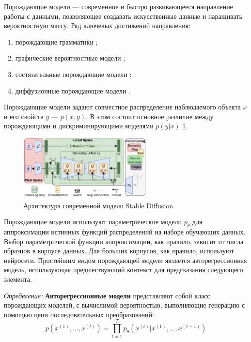 Порождающие модели --- современное и быстро развивающееся направление работы с данными, позволяющее создавать искусственные данные и 
наращивать вероятностную массу. Ряд ключевых достижений направления:
\begin{enumerate}
    \item порождающие грамматики \cite{chomsky2002syntactic};
    \item графические вероятностные модели \cite{pearl1988probabilistic};
    \item состязательные порождающие модели \cite{goodfellow2020generative};
    \item диффузионные порождающие модели \cite{song2020score}.
\end{enumerate}
Порождающие модели задают совместное распределение наблюдаемого объекта $x$ и его свойств $y$ --- $p(x,y)$. 
В этом состоит основное различие между порождающими и дискриминирующими моделями $p(y|x)$ \ref{discr_vs_gen}.
\begin{figure}[h]
    \centering
    \includegraphics[width=0.6\textwidth]{assets/ml/generation/stable_diffusion.png}
    \caption{Архитектура современной модели Stable Diffusion.}
    \label{discr_vs_gen}
\end{figure}

Порождающие модели используют параметрические модели $p_\theta$ для аппроксимации истинных функций распределений на наборе обучающих данных.
Выбор параметрической функции аппроксимации, как правило, зависит от числа образцов в корпусе данных. Для больших корпусов, как правило, используют нейросети.
Простейшим видом порождающей модели является авторегрессионная модель, использующая предшествующий контекст для предсказания следующего элемента.

\textit{Определение:} \textbf{Авторегрессионные модели} представляют собой класс порождающих моделей,
с вычислимой  вероятностью, выполняющие генерацию с помощью цепи последовательных преобразований:
 \begin{equation}
    p(x^{(1)},\dots,x^{(t)}) = \prod_{t=1}^T p_\theta(x^{(t)}|x^{(1)},\dots,x^{(t-1)})
\end{equation}

